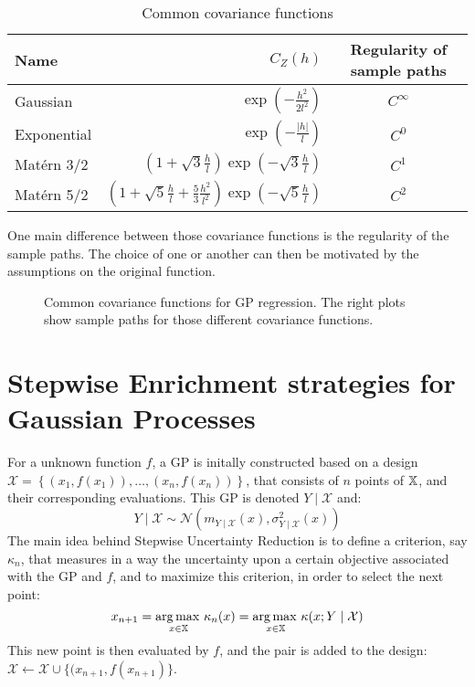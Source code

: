 \documentclass[../../Main_ManuscritThese.tex]{subfiles}
\newcommand\imgpath{/home/victor/acadwriting/Manuscrit/Text/Chapter4/img/}
\begin{document}
  \begin{table}[ht]
    \centering
    \begin{tabular}{lrc}
      \toprule
      Name & $C_Z(h)$ & Regularity of sample paths\\ \midrule
      Gaussian & $\exp\left(- \frac{h^2}{2 l^2}\right)$ & $C^{\infty}$\\
      Exponential &$\exp\left(- \frac{\lvert h \rvert}{l}\right)$ & $C^0$  \\
      Matérn 3/2 & $\left(1 + \sqrt{3}\frac{h}{l}\right)\exp\left(-\sqrt{3}\frac{h}{l}\right)$ & $C^1$\\
      Matérn 5/2 & $\left(1+ \sqrt{5}\frac{h}{l} + \frac{5}{3}\frac{h^2}{l^2}\right) \exp\left(-\sqrt{5}\frac{h}{l}\right)$ & $C^2$\\ \bottomrule
    \end{tabular}
    \caption{\label{tab:common_cov_fc} Common covariance functions}
  \end{table}

  One main difference between those covariance functions is the regularity of the sample paths. The choice of one or another can then be motivated by the assumptions on the original function.

  
\begin{figure}[ht]
  \centering
  
  \caption{\label{fig:cov_fc_examples} Common covariance functions for GP regression. The right plots show sample paths for those different covariance functions.}
\end{figure}


\section{Stepwise Enrichment strategies for Gaussian Processes}
\label{sec:enrichment_strategies}
For a unknown function $f$, a GP is initally constructed based on a design $\mathcal{X} = \left\{\left(x_1,f(x_1)\right), \dots, \left(x_n, f(x_n)\right)\right\}$, that consists of $n$ points of $\mathbb{X}$, and their corresponding evaluations. This GP is denoted $Y \mid \mathcal{X}$ and:
\begin{equation}
  \label{eq:YgivenXGP}
  Y\mid \mathcal{X} \sim \mathcal{N}(m_{Y\mid\mathcal{X}}(x),\sigma^2_{Y\mid\mathcal{X}}(x))
\end{equation}
The main idea behind Stepwise Uncertainty Reduction is to define a criterion, say $\kappa_n$, that measures in a way the uncertainty upon a certain objective associated with the GP and $f$, and to maximize this criterion, in order to select the next point:
\begin{equation}
  x_{n+1} = \operatorname*{arg\,max \,}_{x\in\mathbb{X}} \kappa_n(x) = \operatorname*{arg\,max \,}_{x\in\mathbb{X}} \kappa(x; Y \mid \mathcal{X})
\end{equation}
This new point is then evaluated by $f$, and the pair is added to the design: $\mathcal{X} \gets \mathcal{X} \cup \{(x_{n+1}, f(x_{n+1})\}$.
\end{document}
